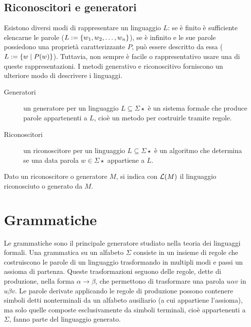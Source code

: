 \subsection*{Riconoscitori e generatori}
Esistono diversi modi di rappresentare un linguaggio $L$: se è finito è sufficiente elencarne le parole ($L:=\left\{ w_1,w_2,\dots,w_n \right\}$), se è infinito e le sue parole possiedono una proprietà caratterizzante $P$, può essere descritto da essa ($L:=\left\{ w\mid P(w) \right\}$). Tuttavia, non sempre è facile o rappresentativo usare una di queste rappresentazioni. I metodi generativo e riconoscitivo forniscono un ulteriore modo di descrivere i linguaggi.

\begin{description}
	\item[Generatori] un generatore per un linguaggio $L\subseteq\Sigma\star$ è un sistema formale che produce parole appartenenti a $L$, cioè un metodo per costruirle tramite regole.
	\item[Riconoscitori] un riconoscitore per un linguaggio $L\subseteq\Sigma\star$ è un algoritmo che determina se una data parola $w\in\Sigma\star$ appartiene a $L$.
\end{description}

\noindent Dato un riconoscitore o generatore $M$, si indica con $\mathcal L(M)$ il linguaggio riconosciuto o generato da $M$.



\section{Grammatiche}
Le grammatiche sono il principale generatore studiato nella teoria dei linguaggi formali. Una grammatica su un alfabeto $\Sigma$ consiste in un insieme di regole che costruiscono le parole di un linguaggio trasformando in multipli modi e passi un assioma di partenza. Queste trasformazioni seguono delle regole, dette di produzione, nella forma $\alpha\to\beta$, che permettono di trasformare una parola $u\alpha v$ in $u\beta v$. Le parole derivate applicando le regole di produzione possono contenere simboli detti nonterminali da un alfabeto ausiliario (a cui appartiene l'assioma), ma solo quelle composte esclusivamente da simboli terminali, cioè appartenenti a $\Sigma$, fanno parte del linguaggio generato.


